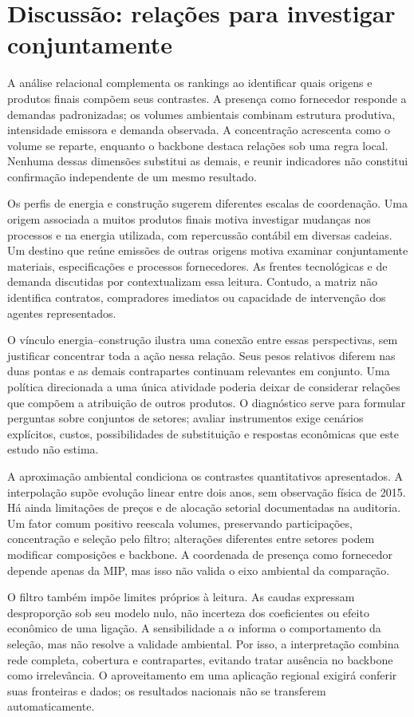 \section{Discussão: relações para investigar conjuntamente}

A análise relacional complementa os rankings ao identificar quais origens e produtos finais compõem seus contrastes. A presença como fornecedor responde a demandas padronizadas; os volumes ambientais combinam estrutura produtiva, intensidade emissora e demanda observada. A concentração acrescenta como o volume se reparte, enquanto o backbone destaca relações sob uma regra local. Nenhuma dessas dimensões substitui as demais, e reunir indicadores não constitui confirmação independente de um mesmo resultado.

Os perfis de energia e construção sugerem diferentes escalas de coordenação. Uma origem associada a muitos produtos finais motiva investigar mudanças nos processos e na energia utilizada, com repercussão contábil em diversas cadeias. Um destino que reúne emissões de outras origens motiva examinar conjuntamente materiais, especificações e processos fornecedores. As frentes tecnológicas e de demanda discutidas por \textcite{rissman2020} contextualizam essa leitura. Contudo, a matriz não identifica contratos, compradores imediatos ou capacidade de intervenção dos agentes representados.

O vínculo energia--construção ilustra uma conexão entre essas perspectivas, sem justificar concentrar toda a ação nessa relação. Seus pesos relativos diferem nas duas pontas e as demais contrapartes continuam relevantes em conjunto. Uma política direcionada a uma única atividade poderia deixar de considerar relações que compõem a atribuição de outros produtos. O diagnóstico serve para formular perguntas sobre conjuntos de setores; avaliar instrumentos exige cenários explícitos, custos, possibilidades de substituição e respostas econômicas que este estudo não estima.

A aproximação ambiental condiciona os contrastes quantitativos apresentados. A interpolação supõe evolução linear entre dois anos, sem observação física de 2015. Há ainda limitações de preços e de alocação setorial documentadas na auditoria. Um fator comum positivo reescala volumes, preservando participações, concentração e seleção pelo filtro; alterações diferentes entre setores podem modificar composições e backbone. A coordenada de presença como fornecedor depende apenas da MIP, mas isso não valida o eixo ambiental da comparação.

O filtro também impõe limites próprios à leitura. As caudas expressam desproporção sob seu modelo nulo, não incerteza dos coeficientes ou efeito econômico de uma ligação. A sensibilidade a $\alpha$ informa o comportamento da seleção, mas não resolve a validade ambiental. Por isso, a interpretação combina rede completa, cobertura e contrapartes, evitando tratar ausência no backbone como irrelevância. O aproveitamento em uma aplicação regional exigirá conferir suas fronteiras e dados; os resultados nacionais não se transferem automaticamente.
